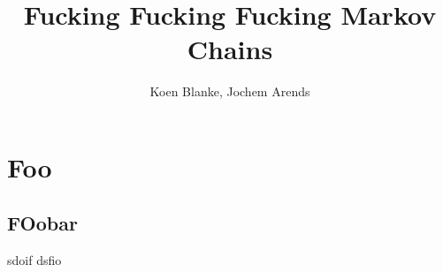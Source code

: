 \documentclass{paper}
\title{Fucking Fucking Fucking Markov Chains}
\author{Koen Blanke, Jochem Arends}
\begin{document}
\maketitle

\begin{abstract}
    \lipsum[1]
\end{abstract}

\section{Foo}

\lipsum[2]

\subsection{FOobar}

sdoif
dsfio
\end{document}
